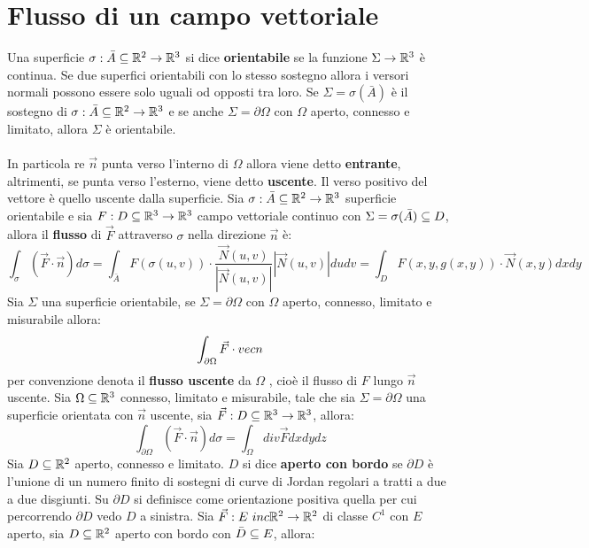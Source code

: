 	\section{Flusso di un campo vettoriale}
	Una superficie $\sigma:\bar{A} \subseteq \mathbb{R}^2 \rightarrow \mathbb{R}^3$ si dice \textbf{orientabile} se la funzione $\Sigma \rightarrow \mathbb{R}^3$ è continua.
	\oss
	Se due superfici orientabili con lo stesso sostegno allora i versori normali possono essere solo uguali od opposti tra loro.
	\prop
	Se $\Sigma = \sigma (\bar A)$ è il sostegno di $\sigma:\bar{A} \subseteq \mathbb{R}^2 \rightarrow \mathbb{R}^3$ e se anche $\Sigma=\partial \Omega$ con $\Omega$ aperto, connesso e limitato, allora $\Sigma$ è orientabile. \\
	\\
	In particola re $\vec n$ punta verso l'interno di $\Omega$ allora viene detto \textbf{entrante}, altrimenti, se punta verso l'esterno, viene detto \textbf{uscente}. Il verso positivo del vettore è quello uscente dalla superficie.
	Sia $\sigma:\bar{A} \subseteq \mathbb{R}^2 \rightarrow \mathbb{R}^3$ superficie orientabile e sia $F:D\subseteq \mathbb{R}^3 \rightarrow \mathbb{R}^3$ campo vettoriale continuo con $\Sigma = \sigma (\bar A)\subseteq D$, allora il \textbf{flusso} di $\vec F$ attraverso $\sigma$ nella direzione $\vec n$ è:
	$$\int_\sigma (\vec F \cdot \vec n) d\sigma = \int_{\bar A}F(\sigma(u,v))\cdot \frac{\vec N(u,v)}{|\vec N(u,v)|}|\vec N(u,v)|dudv=\int_D F(x,y,g(x,y))\cdot \vec N(x,y)dxdy$$
	Sia $\Sigma$ una superficie orientabile, se $\Sigma=\partial \Omega$ con $\Omega$ aperto, connesso, limitato e misurabile allora:
	$$\int_{\partial \Omega} \vec F \cdot \\vec n$$
	per convenzione denota il \textbf{flusso uscente} da $\Omega$ , cioè il flusso di $F$ lungo $\vec n$ uscente.
	Sia $\Omega \subseteq \mathbb{R}^3$ connesso, limitato e misurabile, tale che sia $\Sigma=\partial \Omega$ una superficie orientata con $\vec n$ uscente, sia $\vec F:D \subseteq \mathbb{R}^3 \rightarrow \mathbb{R}^3$, allora:
	$$\int_{\partial \Omega}(\vec F \cdot \vec n)d\sigma=\int_\Omega div \vec F dxdydz$$
	Sia $D \subseteq \mathbb{R}^2$ aperto, connesso e limitato. $D$ si dice \textbf{aperto con bordo} se $\partial D$ è l'unione di un numero finito di sostegni di curve di Jordan regolari a tratti a due a due disgiunti. Su $\partial D$ si definisce come orientazione positiva quella per cui percorrendo $\partial D$ vedo $D$ a sinistra.
	Sia $\vec F:E\ inc \mathbb{R}^2 \rightarrow \mathbb{R}^2$ di classe $C^1$ con $E$ aperto, sia $D\subseteq \mathbb{R}^2$ aperto con bordo con $\bar D \subseteq E$, allora:
